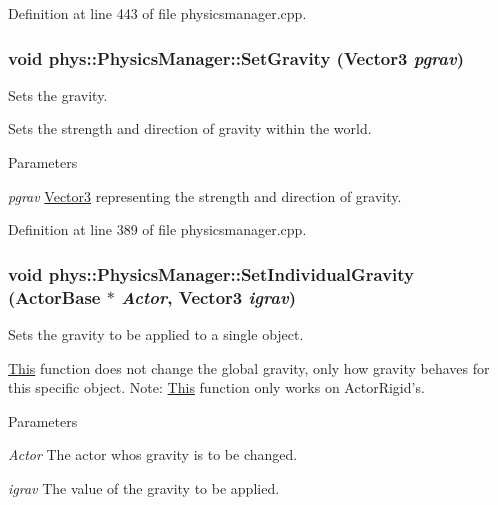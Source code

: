 Definition at line 443 of file physicsmanager.cpp.

\hypertarget{classphys_1_1PhysicsManager_a3e74f3e0288706d44dc90657a8fa1118}{
\subsubsection[{SetGravity}]{\setlength{\rightskip}{0pt plus 5cm}void phys::PhysicsManager::SetGravity ({\bf Vector3} {\em pgrav})}}
\label{d3/dcc/classphys_1_1PhysicsManager_a3e74f3e0288706d44dc90657a8fa1118}


Sets the gravity. 

Sets the strength and direction of gravity within the world. 
\begin{DoxyParams}{Parameters}
\item[{\em pgrav}]\hyperlink{classphys_1_1Vector3}{Vector3} representing the strength and direction of gravity. \end{DoxyParams}


Definition at line 389 of file physicsmanager.cpp.

\hypertarget{classphys_1_1PhysicsManager_af6acab3a35e52b1e25f1ab47f494d90d}{
\subsubsection[{SetIndividualGravity}]{\setlength{\rightskip}{0pt plus 5cm}void phys::PhysicsManager::SetIndividualGravity ({\bf ActorBase} $\ast$ {\em Actor}, \/  {\bf Vector3} {\em igrav})}}
\label{d3/dcc/classphys_1_1PhysicsManager_af6acab3a35e52b1e25f1ab47f494d90d}


Sets the gravity to be applied to a single object. 

\hyperlink{structThis}{This} function does not change the global gravity, only how gravity behaves for this specific object. Note: \hyperlink{structThis}{This} function only works on ActorRigid's. 
\begin{DoxyParams}{Parameters}
\item[{\em Actor}]The actor whos gravity is to be changed. \item[{\em igrav}]The value of the gravity to be applied. \end{DoxyParams}


